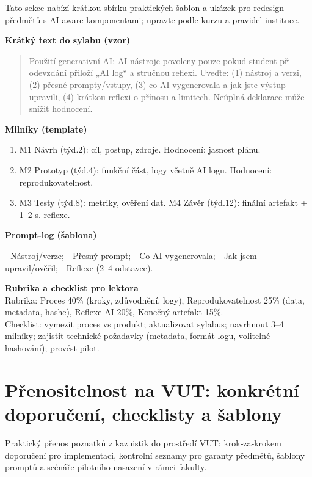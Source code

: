 \documentclass{report}%
\begin{document}
%
Tato sekce nabízí krátkou sbírku praktických šablon a ukázek pro redesign předmětů s AI‑aware komponentami; upravte podle kurzu a pravidel instituce.

\bigskip

\textbf{Krátký text do sylabu (vzor)}
\begin{quote}
Použití generativní AI: AI nástroje povoleny pouze pokud student při odevzdání přiloží „AI log“ a stručnou reflexi. Uveďte: (1) nástroj a verzi, (2) přesné prompty/vstupy, (3) co AI vygenerovala a jak jste výstup upravili, (4) krátkou reflexi o přínosu a limitech. Neúplná deklarace může snížit hodnocení.
\end{quote}

\bigskip

\textbf{Milníky (template)}
\begin{enumerate}
  \item M1 Návrh (týd.2): cíl, postup, zdroje. Hodnocení: jasnost plánu.
  \item M2 Prototyp (týd.4): funkční část, logy včetně AI logu. Hodnocení: reprodukovatelnost.
  \item M3 Testy (týd.8): metriky, ověření dat. M4 Závěr (týd.12): finální artefakt + 1–2 s. reflexe.
\end{enumerate}

\bigskip

\textbf{Prompt‑log (šablona)}\\
\begin{PromptBlock}


- Nástroj/verze; - Přesný prompt; - Co AI vygenerovala; - Jak jsem upravil/ověřil; - Reflexe (2–4 odstavce).
\end{PromptBlock}



\bigskip

\textbf{Rubrika a checklist pro lektora}\\
Rubrika: Proces 40\% (kroky, zdůvodnění, logy), Reprodukovatelnost 25\% (data, metadata, hashe), Reflexe AI 20\%, Konečný artefakt 15\%.\\
Checklist: vymezit proces vs produkt; aktualizovat sylabus; navrhnout 3–4 milníky; zajistit technické požadavky (metadata, formát logu, volitelné hashování); provést pilot.%

%
\section{Přenositelnost na VUT: konkrétní doporučení, checklisty a šablony}%
Praktický přenos poznatků z kazuistik do prostředí VUT: krok‑za‑krokem doporučení pro implementaci, kontrolní seznamy pro garanty předmětů, šablony promptů a scénáře pilotního nasazení v rámci fakulty.%
\end{document}
